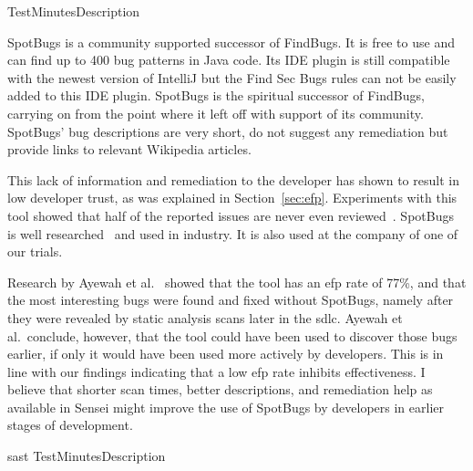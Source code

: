 
{Test}{Minutes}{Description}

{
\label{bc:SpotBugs}
SpotBugs is a community supported successor of FindBugs.
It is free to use and can find up to 400 bug patterns in Java code.
Its IDE plugin is still compatible with the newest version of IntelliJ but the Find Sec Bugs rules can not be easily added to this IDE plugin.
SpotBugs is the spiritual successor of FindBugs, carrying on from the point where it left off with support of its community.
SpotBugs' bug descriptions are very short, do not suggest any remediation but provide links to relevant Wikipedia articles. 

This lack of information and remediation to the developer has shown to result in low developer trust, as was explained in Section~\ref{sec:efp}.
Experiments with this tool showed that half of the reported issues are never even reviewed~\cite{ayewah2007using}.
SpotBugs is well researched~\cite{ayewah2007using,ayewah2010google,findbugs2008} and used in industry.
It is also used at the company of one of our trials.

Research by Ayewah et al.~\cite{ayewah2007using} showed that the tool has an \gls{efp} rate of 77\%, and that the most interesting bugs were found and fixed without SpotBugs, namely after they were revealed by static analysis scans later in the \gls{sdlc}. Ayewah et al.\ conclude, however, that the tool could have been used to discover those bugs earlier, if only it would have been used more actively by developers. This is in line with our findings indicating that a low \gls{efp} rate inhibits effectiveness. I believe that shorter scan times, better descriptions, and remediation help as available in Sensei might improve the use of SpotBugs by developers in earlier stages of development.
}{\gls{sast}}
{Test}{Minutes}{Description}

